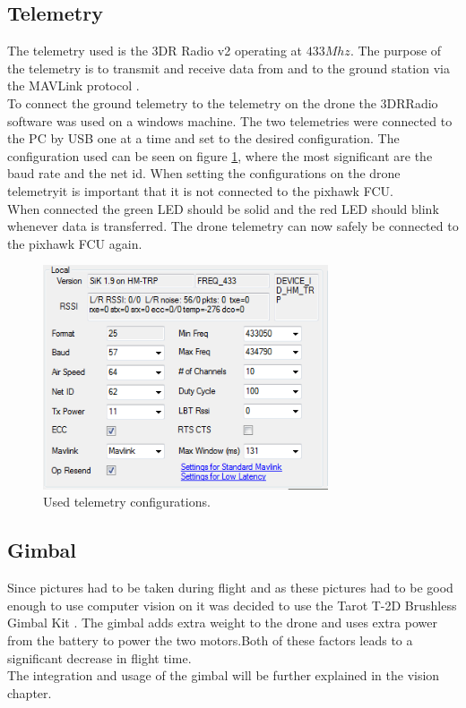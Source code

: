 \subsection*{Telemetry}
The telemetry used is the 3DR Radio v2 \cite{Ref:Telem} operating at $433 Mhz$. The purpose of the
telemetry is to transmit and receive data from and to the ground station via the MAVLink protocol
\cite{Ref:MAVLink}.\\
To connect the ground telemetry to the telemetry on the drone the 3DRRadio software was used on a
windows machine. The two telemetries were connected to the PC by USB one at a time and set to the
desired configuration. The configuration used can be seen on figure \ref{fig:telem}, where the most
significant are the baud rate and the net id. When setting the configurations on the drone
telemetryit is important that it is not connected to the pixhawk FCU.\\
When connected the green LED should be solid and the red LED should blink whenever data is
transferred. The drone telemetry can now safely be connected to the pixhawk FCU again.

\begin{figure}[H]
  \centering
    \includegraphics[width=0.75\textwidth]{./Images/telem}
  \caption{Used telemetry configurations.}
  \label{fig:telem}
\end{figure}

\subsection*{Gimbal}
Since pictures had to be taken during flight and as these pictures had to be good enough to use
computer vision on it was decided to use the Tarot T-2D Brushless Gimbal Kit \cite{Ref:Gimbal}. The
gimbal adds extra weight to the drone and uses extra power from the battery to power the two
motors.Both of these factors leads to a significant decrease in flight time.\\
The integration and usage of the gimbal will be further explained in the vision chapter. 
